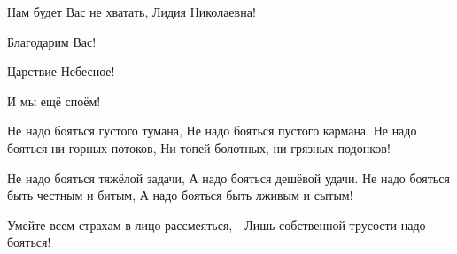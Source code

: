 Нам будет Вас не хватать, Лидия Николаевна!

Благодарим Вас!

Царствие Небесное!

И мы ещё споём!

Не надо бояться густого тумана,
Не надо бояться пустого кармана.
Не надо бояться ни горных потоков,
Ни топей болотных, ни грязных подонков!

Не надо бояться тяжёлой задачи,
А надо бояться дешёвой удачи.
Не надо бояться быть честным и битым,
А надо бояться быть лживым и сытым!

Умейте всем страхам в лицо рассмеяться, -
Лишь собственной трусости надо бояться!
